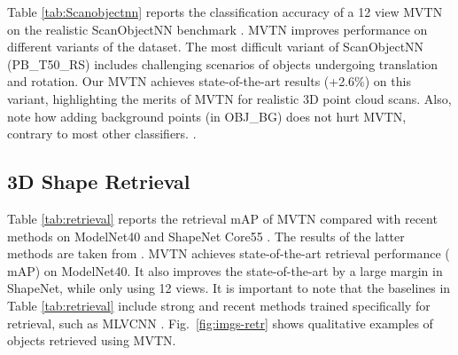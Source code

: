 \documentclass[10pt,twocolumn,letterpaper]{article}
\newcommand{\figLabel}{Fig.~}
\begin{document}
Table \ref{tab:Scanobjectnn} reports the classification accuracy of a 12 view MVTN on the realistic ScanObjectNN benchmark \cite{scanobjectnn}. MVTN improves performance on different variants of the dataset. The most difficult variant of ScanObjectNN (PB\_T50\_RS) includes challenging scenarios of objects undergoing translation and rotation. Our MVTN achieves state-of-the-art results (+2.6\%) on this variant, highlighting the merits of MVTN for realistic 3D point cloud scans. Also, note how adding background points (in OBJ\_BG) does not hurt MVTN, contrary to most other classifiers. . 


\subsection{3D Shape Retrieval} 
\label{sec:exp-retr}
Table \ref{tab:retrieval} reports the retrieval mAP of MVTN compared with recent methods on ModelNet40 \cite{modelnet} and ShapeNet Core55 \cite{shapenet}. The results of the latter methods are taken from \cite{mlvcnn,mvviewgcn,pvnet}. 
MVTN achieves state-of-the-art retrieval performance ( mAP) on ModelNet40. It also improves the state-of-the-art by a large margin in ShapeNet, while only using 12 views. It is important to note that the baselines in Table \ref{tab:retrieval} include strong and recent methods trained specifically for retrieval, such as MLVCNN \cite{mlvcnn}.
 \figLabel{\ref{fig:imgs-retr}} shows qualitative examples of objects retrieved using MVTN.


\begin{table}[t]

\tabcolsep=0.3cm
\centering
{}
\vspace{2pt}
\caption{\small \textbf{Rotation Robustness on ModelNet40.} 
At test time, we randomly rotate objects in ModelNet40 around the Y-axis (gravity) with different ranges and report the overall accuracy. MVTN displays strong robustness to such Y-rotations.}
\label{tbl:y-robustness}
\end{table}
\end{document}
